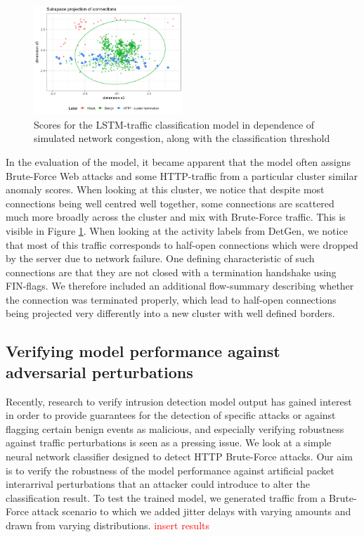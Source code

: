 \documentclass[sigconf]{acmart}
\begin{document}
\begin{figure}
\centering
\includegraphics[width=0.5\textwidth]{images/Subspace_projection.png}
\caption{Scores for the LSTM-traffic classification model in dependence of simulated network congestion, along with the classification threshold}\label{fig:Subspace_projection}
\end{figure}

In the evaluation of the model, it became apparent that the model often assigns Brute-Force Web attacks and some HTTP-traffic from a particular cluster similar anomaly scores. When looking at this cluster, we notice that despite most connections being well centred well together, some 
connections are scattered much more broadly across the cluster and mix with Brute-Force traffic.
This is visible in Figure \ref{fig:Subspace_projection}. When looking at the activity labels from DetGen, we notice that most of this traffic corresponds to half-open connections which were dropped by the server due to network failure. One defining characteristic of such connections are that they are not closed with a termination handshake using FIN-flags. We therefore included an additional flow-summary describing whether the connection was terminated properly, which lead to half-open connections being projected very differently into a new cluster with well defined borders.


\subsection{Verifying model performance against adversarial perturbations}

Recently, research to verify intrusion detection model output has gained interest in order to provide guarantees for the detection of specific attacks or against flagging certain benign events as malicious, and especially verifying robustness against traffic perturbations is seen as a pressing issue. 
We look at a simple neural network classifier designed to detect HTTP Brute-Force attacks. Our aim is to verify the robustness of the model performance against artificial packet interarrival perturbations that an attacker could introduce to  alter the classification result. 
To test the trained model, we generated traffic from a Brute-Force attack scenario to which we added jitter delays with varying amounts and drawn from varying distributions. 
\cite{kokke2020neural}
\textcolor{red}{insert results}
\end{document}
